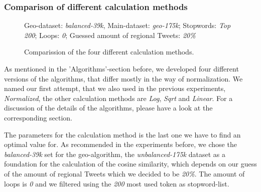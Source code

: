 \documentclass[../Main.tex]{subfiles}
\begin{document}
\subsubsection{Comparison of different calculation methods}
\begin{figure}
\begin{center}
\end{center}
  \label{geo_graph4}
Geo-dataset: \textit{balanced-39k}, Main-dataset: \textit{geo-175k}; Stopwords: \textit{Top 200}; Loops: \textit{0}; Guessed amount of regional Tweets: \textit{20\%}
  \caption{Comparission of the four different calculation methods.}
\end{figure}


As mentioned in the 'Algorithms'-section before, we developed four different versions of the algorithms, that differ mostly in the way of normalization. We named our first attempt, that we also used in the previous experiments, \emph{Normalized}, the other calculation methods are \emph{Log}, \emph{Sqrt} and \emph{Linear}. For a discussion of the details of the algorithms, please have a look at the corresponding section. 

The parameters for the calculation method is the last one we have to find an optimal value for. As recommended in the experiments before, we chose the \emph{balanced-39k} set for the geo-algorithm, the \emph{unbalanced-175k} dataset as a foundation for the calculation of the cosine similarity, which depends on our guess of the amount of regional Tweets which we  decided to be \emph{20\%}. The amount of loops is \emph{0} and we filtered using the \emph{200} most used token as stopword-list.
\end{document}
